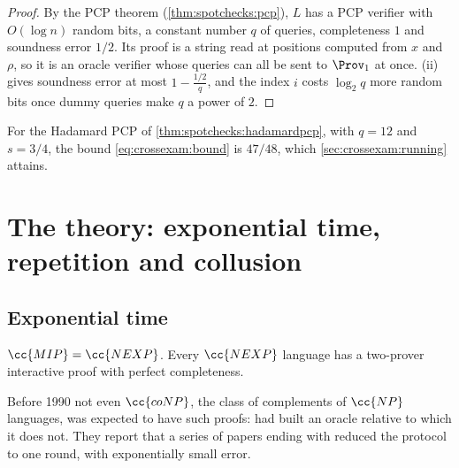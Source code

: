 \begin{refsection}

\begin{proof}
By the PCP theorem (\cref{thm:spotchecks:pcp}), $L$ has a PCP verifier with $O(\log n)$ random bits, a constant number $q$ of queries, completeness $1$ and soundness error $1/2$. Its proof is a string read at positions computed from $x$ and $\rho$, so it is an oracle verifier whose queries can all be sent to $\Prov_1$ at once. (ii) gives soundness error at most $1-\frac{1/2}q$, and the index $i$ costs $\log_2q$ more random bits once dummy queries make $q$ a power of $2$.
\end{proof}

For the Hadamard PCP of \cref{thm:spotchecks:hadamardpcp}, with $q=12$ and $s=3/4$, the bound \eqref{eq:crossexam:bound} is $47/48$, which \cref{sec:crossexam:running} attains.

\section{The theory: exponential time, repetition and collusion}\label{sec:crossexam:limits}

\subsection{Exponential time}\label{sec:crossexam:nexp}

\begin{theorem}[$\cc{MIP}=\cc{NEXP}$; \textcite{BabaiFortnowLund1991}]\label{thm:crossexam:nexp}
$\cc{MIP}=\cc{NEXP}$. Every $\cc{NEXP}$ language has a two-prover interactive proof with perfect completeness.
\end{theorem}

Before 1990 not even $\cc{coNP}$, the class of complements of $\cc{NP}$ languages, was expected to have such proofs: \textcite{FortnowRompelSipser1994} had built an oracle relative to which it does not. They report that a series of papers ending with \textcite{FeigeLovasz1992} reduced the protocol to one round, with exponentially small error.


\end{refsection}
